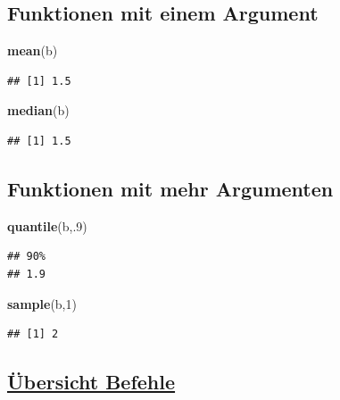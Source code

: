 \documentclass[]{article}
\newenvironment{Shaded}{\begin{snugshade}}{\end{snugshade}}
\newcommand{\KeywordTok}[1]{\textcolor[rgb]{0.13,0.29,0.53}{\textbf{{#1}}}}
\newcommand{\DecValTok}[1]{\textcolor[rgb]{0.00,0.00,0.81}{{#1}}}
\newcommand{\NormalTok}[1]{{#1}}
\begin{document}
\subsection{Funktionen mit einem
Argument}\label{funktionen-mit-einem-argument}

\begin{Shaded}
\begin{Highlighting}[]
\KeywordTok{mean}\NormalTok{(b)}
\end{Highlighting}
\end{Shaded}

\begin{verbatim}
## [1] 1.5
\end{verbatim}

\begin{Shaded}
\begin{Highlighting}[]
\KeywordTok{median}\NormalTok{(b)}
\end{Highlighting}
\end{Shaded}

\begin{verbatim}
## [1] 1.5
\end{verbatim}

\subsection{Funktionen mit mehr
Argumenten}\label{funktionen-mit-mehr-argumenten-1}

\begin{Shaded}
\begin{Highlighting}[]
\KeywordTok{quantile}\NormalTok{(b,.}\DecValTok{9}\NormalTok{)}
\end{Highlighting}
\end{Shaded}

\begin{verbatim}
## 90% 
## 1.9
\end{verbatim}

\begin{Shaded}
\begin{Highlighting}[]
\KeywordTok{sample}\NormalTok{(b,}\DecValTok{1}\NormalTok{) }
\end{Highlighting}
\end{Shaded}

\begin{verbatim}
## [1] 2
\end{verbatim}

\subsection{\texorpdfstring{\href{http://cran.r-project.org/doc/manuals/R-intro.html}{Übersicht
Befehle}}{Übersicht Befehle}}\label{ubersicht-befehle}
\end{document}
